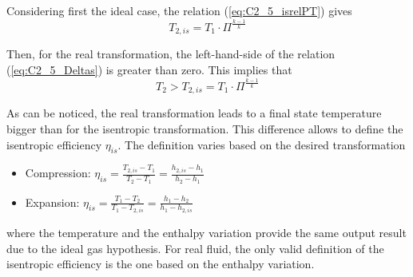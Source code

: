 Considering first the ideal case, the relation (\ref{eq:C2_5_isrelPT}) gives
\begin{equation}
T_{2,is} = T_1\cdot\Pi^\frac{k-1}{k}
\end{equation}

Then, for the real transformation, the left-hand-side of the relation (\ref{eq:C2_5_Deltas}) is greater than zero. This implies that
\begin{equation}
T_{2} > T_{2,is} = T_1\cdot\Pi^\frac{k-1}{k}
\end{equation}

As can be noticed, the real transformation leads to a final state temperature bigger than for the isentropic transformation. This difference allows to define the isentropic efficiency $\eta_{is}$. The definition varies based on the desired transformation
\begin{itemize}
\item Compression: $\eta_{is}=\frac{T_{2,is}-T_1}{T_2-T_1}=\frac{h_{2,is}-h_1}{h_2-h_1}$
\item Expansion: $\eta_{is}=\frac{T_1-T_{2}}{T_1-T_{2,is}}=\frac{h_1-h_{2}}{h_1-h_{2,is}}$
\end{itemize}
where the temperature and the enthalpy variation provide the same output result due to the ideal gas hypothesis. For real fluid, the only valid definition of the isentropic efficiency is the one based on the enthalpy variation. 